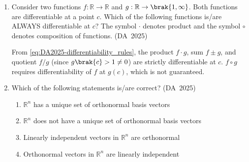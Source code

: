 \begin{enumerate}[label=\thesubsection.\arabic*, ref=\thesubsection.\theenumi]
\begin{enumerate}
\end{enumerate}
\solution
From \eqref{eq:DA2025-python_extend}:
\begin{align}
	A.\text{extend}\brak{B} \implies A \gets \sbrak{1, 2, 3, 4, 5, 6}
\end{align}
The following code verifies the solution
\begin{lstlisting}[frame=single, basicstyle=\rmfamily, xleftmargin=0pt, escapeinside={(*@}{@*)}]
(*@\makebox[\dimexpr\linewidth-2\fboxsep-2\fboxrule\relax][c]{codes/q12/q12.py}@*)
\end{lstlisting}
	\item 
	Consider two functions $f: \mathbb{R} \to \mathbb{R}$ and $g: \mathbb{R} \to \brak{1, \infty}$. Both functions are differentiable at a point $c$. Which of the following functions is/are ALWAYS differentiable at $c$? The symbol $\cdot$ denotes product and the symbol $\circ$ denotes composition of functions.
	\hfill (DA~2025)
	\begin{enumerate}
	\end{enumerate}
	\solution
	From \eqref{eq:DA2025-differentiability_rules}, the product $f \cdot g$, sum $f \pm g$, and quotient $f/g$ (since $g\brak{c} > 1 \ne 0$) are strictly differentiable at $c$. $f \circ g$ requires differentiability of $f$ at $g(c)$, which is not guaranteed.
	
\item 
Which of the following statements is/are correct?
\hfill (DA~2025)
\begin{enumerate}
	\item $\mathbb{R}^n$ has a unique set of orthonormal basis vectors
	\item $\mathbb{R}^n$ does not have a unique set of orthonormal basis vectors
	\item Linearly independent vectors in $\mathbb{R}^n$ are orthonormal
	\item Orthonormal vectors in $\mathbb{R}^n$ are linearly independent
\end{enumerate}


\end{enumerate}
